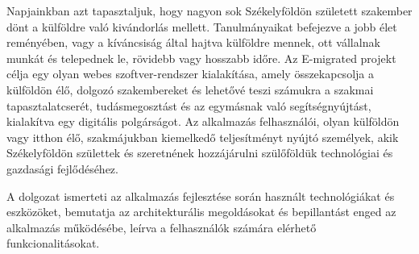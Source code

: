 Napjainkban azt tapasztaljuk, hogy nagyon sok Székelyföldön született szakember dönt a külföldre való kivándorlás mellett. Tanulmányaikat befejezve a jobb élet reményében, vagy a kíváncsiság által hajtva külföldre mennek, ott vállalnak munkát és telepednek le, rövidebb vagy hosszabb időre.  Az E-migrated projekt célja egy olyan webes szoftver-rendszer kialakítása, amely összekapcsolja a külföldön élő, dolgozó szakembereket és lehetővé teszi számukra a szakmai tapasztalatcserét, tudásmegosztást és az egymásnak való segítségnyújtást, kialakítva egy digitális polgárságot. Az alkalmazás felhasználói, olyan külföldön vagy itthon élő, szakmájukban kiemelkedő teljesítményt nyújtó személyek, akik Székelyföldön születtek és szeretnének hozzájárulni szülőföldük technológiai és gazdasági fejlődéséhez.

A dolgozat ismerteti az alkalmazás fejlesztése során használt technológiákat és eszközöket,  bemutatja az architekturális megoldásokat és bepillantást enged az alkalmazás működésébe, leírva a felhasználók számára elérhető funkcionalitásokat. 
